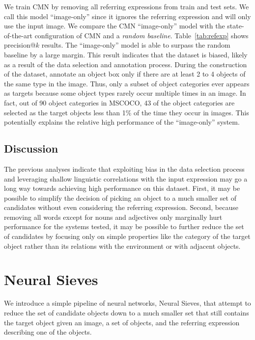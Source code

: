 \documentclass[11pt,a4paper]{article}
\begin{document}
We train CMN by removing all referring expressions from train and test sets.
We call this model ``image-only'' since it ignores the referring expression and will only use the input image. 
We compare the CMN ``image-only'' model with the state-of-the-art configuration of CMN and a \textit{random baseline}. 
\tableseven
Table~\ref{tab:refexp} shows precision@$k$ results.
The ``image-only'' model
is able to surpass the random baseline by a large margin.
This result indicates that the dataset is biased, likely as a result of the data selection and annotation process.
During the construction of the dataset, \citet{mao2016generation} annotate an object box only if there are at least 2 to 4 objects of the same type in the image.
Thus, only a subset of object categories ever appears as targets because some object types rarely occur multiple times in an image.
In fact, out of 90 object categories in MSCOCO, 43 of the object categories are selected as the target objects less than 1\% of the time they occur in images.
This potentially explains the relative high performance of the ``image-only'' system.

\subsection{Discussion}%
The previous analyses indicate that exploiting bias in the data selection process and leveraging shallow linguistic correlations with the input expression may go a long way towards achieving high performance on this dataset.
First, it may be possible to simplify the decision of picking an object to a much smaller set of candidates without even considering the referring expression. 
Second, because removing all words except for nouns and adjectives only marginally hurt performance for the systems tested, it may be possible to further reduce the set of candidates by focusing only on simple properties like the category of the target object rather than its relations with the environment or with adjacent objects.  
%
\vspace{-5pt}
\section{Neural Sieves} \label{sec:neuralsieves}
\vspace{-5pt}
We introduce a simple pipeline of neural networks, Neural Sieves, that attempt to reduce the set of candidate objects down to a much smaller set that still contains the target object given an image, a set of objects, and the referring expression describing one of the objects.
\end{document}
